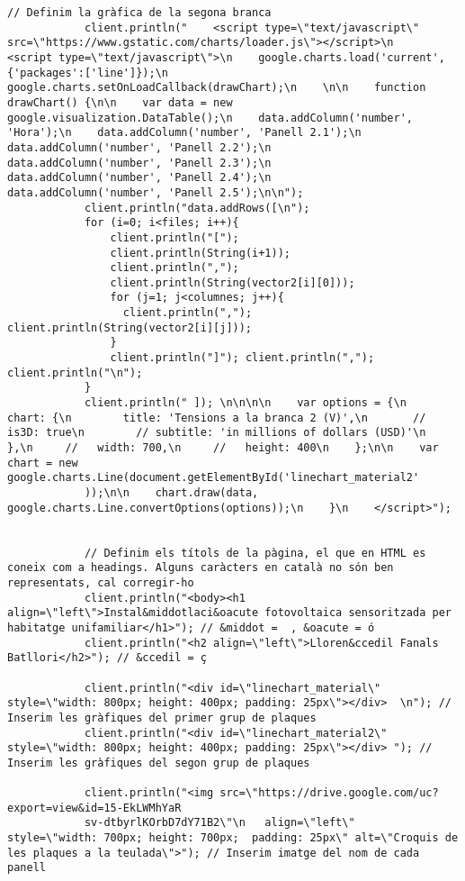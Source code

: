 \begin{lstlisting}[style=myArduino]
            // Definim la gràfica de la segona branca
            client.println("    <script type=\"text/javascript\" src=\"https://www.gstatic.com/charts/loader.js\"></script>\n    <script type=\"text/javascript\">\n    google.charts.load('current', {'packages':['line']});\n    google.charts.setOnLoadCallback(drawChart);\n    \n\n    function drawChart() {\n\n    var data = new google.visualization.DataTable();\n    data.addColumn('number', 'Hora');\n    data.addColumn('number', 'Panell 2.1');\n      data.addColumn('number', 'Panell 2.2');\n      data.addColumn('number', 'Panell 2.3');\n      data.addColumn('number', 'Panell 2.4');\n      data.addColumn('number', 'Panell 2.5');\n\n");
            client.println("data.addRows([\n");
            for (i=0; i<files; i++){
                client.println("[");
                client.println(String(i+1)); 
                client.println(",");
                client.println(String(vector2[i][0]));
                for (j=1; j<columnes; j++){
                  client.println(","); client.println(String(vector2[i][j]));
                }  
                client.println("]"); client.println(","); client.println("\n");
            }
            client.println(" ]); \n\n\n\n    var options = {\n        chart: {\n        title: 'Tensions a la branca 2 (V)',\n       // is3D: true\n        // subtitle: 'in millions of dollars (USD)'\n        },\n     //   width: 700,\n     //   height: 400\n    };\n\n    var chart = new google.charts.Line(document.getElementById('linechart_material2'
            ));\n\n    chart.draw(data, google.charts.Line.convertOptions(options));\n    }\n    </script>");

           
            // Definim els títols de la pàgina, el que en HTML es coneix com a headings. Alguns caràcters en català no són ben representats, cal corregir-ho
            client.println("<body><h1 align=\"left\">Instal&middotlaci&oacute fotovoltaica sensoritzada per habitatge unifamiliar</h1>"); // &middot =  , &oacute = ó
            client.println("<h2 align=\"left\">Lloren&ccedil Fanals Batllori</h2>"); // &ccedil = ç

            client.println("<div id=\"linechart_material\" style=\"width: 800px; height: 400px; padding: 25px\"></div>  \n"); // Inserim les gràfiques del primer grup de plaques
            client.println("<div id=\"linechart_material2\" style=\"width: 800px; height: 400px; padding: 25px\"></div> "); // Inserim les gràfiques del segon grup de plaques
          
            client.println("<img src=\"https://drive.google.com/uc?export=view&id=15-EkLWMhYaR
            sv-dtbyrlKOrbD7dY71B2\"\n   align=\"left\"      style=\"width: 700px; height: 700px;  padding: 25px\" alt=\"Croquis de les plaques a la teulada\">"); // Inserim imatge del nom de cada panell
 

\end{lstlisting}
